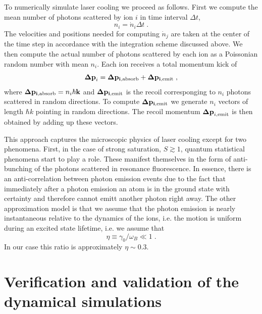 \documentclass[aps, pra, preprint]{revtex4-1}
\begin{document}
To numerically simulate laser cooling we proceed as follows.
First we compute the mean number of photons scattered by ion $i$
in time interval $\Delta t$,
\begin{equation}
n_i=\dot{n}_i \Delta t\;.
\end{equation}
The velocities and positions needed for computing $\dot{n}_j$ are taken
at the center of the time step in accordance with the integration scheme
discussed above.  We then compute the actual number of photons scattered
by each ion as a Poissonian random number with mean $n_i$.  Each
ion receives a total momentum kick of 
\begin{equation}
\mathbf{\Delta p}_i = \mathbf{\Delta p_{i,{\rm absorb}}} + 
\mathbf{\Delta p_{i,{\rm emit}}}\;,
\end{equation}
where $\mathbf{\Delta p_{i,{\rm absorb}}}=n_i \hbar \mathbf{k}$ and
$\mathbf{\Delta p_{i,{\rm emit}}}$ is the recoil corresponging to $n_i$
photons scattered in random directions. To compute $\mathbf{\Delta
p_{i,{\rm emit}}}$ we generate $n_i$ vectors of length $\hbar k$
pointing in random directions.  The recoil momentum $\mathbf{\Delta
p}_{i,{\rm emit}}$ is then obtained by adding up these vectors.

This approach captures the microscopic physics of laser cooling
except for two phenomena. First, in the case of strong
saturation, $S\gtrsim 1$, quantum statistical phenomena start to
play a role. These manifest themselves in the form of
anti-bunching of the photons scattered in resonance fluorescence.
In essence, there is an anti-correlation between photon emission
events due to the fact that immediately after a photon emission
an atom is in the ground state with certainty and therefore
cannot emitt another photon right away. The other approximation
model is that we assume that the photon emission is nearly
instantaneous relative to the dynamics of the ions, i.e. the
motion is uniform during an excited state lifetime, i.e. we
assume that 
\begin{equation}
\eta\equiv\gamma_0/\omega_B\ll 1\;.
\end{equation}
In our case this ratio is approximately $\eta \sim 0.3$.



\section{Verification and validation of the dynamical
simulations}
\label{sec:VerificationAndValidation}
\end{document}
